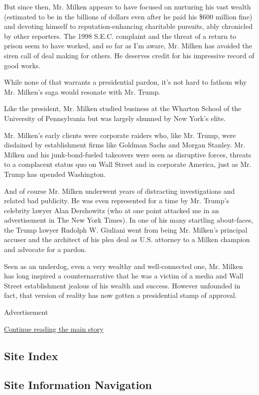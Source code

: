 But since then, Mr. Milken appears to have focused on nurturing his vast
wealth (estimated to be in the billions of dollars even after he paid
his \$600 million fine) and devoting himself to reputation-enhancing
charitable pursuits, ably chronicled by other reporters. The 1998 S.E.C.
complaint and the threat of a return to prison seem to have worked, and
so far as I'm aware, Mr. Milken has avoided the siren call of deal
making for others. He deserves credit for his impressive record of good
works.

While none of that warrants a presidential pardon, it's not hard to
fathom why Mr. Milken's saga would resonate with Mr. Trump.

Like the president, Mr. Milken studied business at the Wharton School of
the University of Pennsylvania but was largely shunned by New York's
elite.

Mr. Milken's early clients were corporate raiders who, like Mr. Trump,
were disdained by establishment firms like Goldman Sachs and Morgan
Stanley. Mr. Milken and his junk-bond-fueled takeovers were seen as
disruptive forces, threats to a complacent status quo on Wall Street and
in corporate America, just as Mr. Trump has upended Washington.

And of course Mr. Milken underwent years of distracting investigations
and related bad publicity. He was even represented for a time by Mr.
Trump's celebrity lawyer Alan Dershowitz (who at one point attacked me
in an advertisement in The New York Times). In one of his many startling
about-faces, the Trump lawyer Rudolph W. Giuliani went from being Mr.
Milken's principal accuser and the architect of his plea deal as U.S.
attorney to a Milken champion and advocate for a pardon.

Seen as an underdog, even a very wealthy and well-connected one, Mr.
Milken has long inspired a counternarrative that he was a victim of a
media and Wall Street establishment jealous of his wealth and success.
However unfounded in fact, that version of reality has now gotten a
presidential stamp of approval.

Advertisement

\protect\hyperlink{after-bottom}{Continue reading the main story}

\hypertarget{site-index}{%
\subsection{Site Index}\label{site-index}}

\hypertarget{site-information-navigation}{%
\subsection{Site Information
Navigation}\label{site-information-navigation}}

